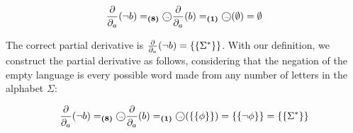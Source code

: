 \[\frac{\partial}{\partial_{a}}(\neg b)
   =_{\textbf{(8)}} \text{\textcircled{\tiny$\neg$}} \frac{\partial}{\partial_{a}}(b)
   =_{\textbf{(1)}} \text{\textcircled{\tiny$\neg$}} (\emptyset)
   = \emptyset
\]

The correct partial derivative is $\frac{\partial}{\partial_{a}}(\neg b) = \{\{\Sigma^*\}\}$. With our
definition, we construct the partial derivative as follows, considering that the
negation of the empty language is every possible word made from any number of
letters in the alphabet $\Sigma$:

\[\frac{\partial}{\partial_{a}}(\neg b)
   =_{\textbf{(8)}} \text{\textcircled{\tiny$\neg$}} \frac{\partial}{\partial_{a}}(b)
   =_{\textbf{(1)}} \text{\textcircled{\tiny$\neg$}} (\{\{\phi\}\})
   = \{\{\neg\phi\}\}
   = \{\{\Sigma^*\}\}
\]


